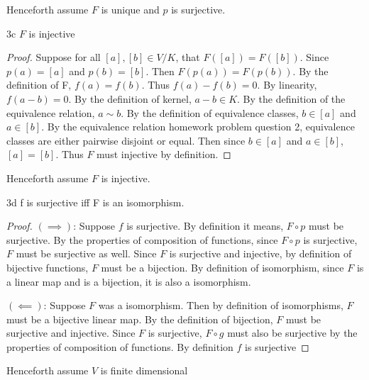\documentclass{article}
\begin{document}
Henceforth assume $F$ is unique and $p$ is surjective.

\begin{claim}{3c}
    $F$ is injective
\end{claim}
\begin{proof}
    Suppose for all $[a], [b] \in V/K$, that $F([a]) = F([b])$. Since $p(a) = [a]$ and $p(b) = [b]$. Then $F(p(a)) = F(p(b))$. By the definition of F, $f(a) = f(b)$. Thus $f(a) - f(b) = 0$. By linearity, $f(a - b) = 0$. By the definition of kernel, $a - b \in K$. By the definition of the equivalence relation, $a \sim b$. By the definition of equivalence classes, $b \in [a]$ and $a \in [b]$. By the equivalence relation homework problem question 2, equivalence classes are either pairwise disjoint or equal. Then since $b \in [a]$ and $a \in [b]$, $[a] = [b]$. Thus $F$ must injective by definition. 
\end{proof}

Henceforth assume $F$ is injective.

\begin{claim}{3d}
    f is surjective iff F is an isomorphism.
\end{claim}
\begin{proof}
    $(\implies)$: Suppose $f$ is surjective. By definition it means, $F \circ p$ must be surjective. By the properties of composition of functions, since $F \circ p$ is surjective, $F$ must be surjective as well. Since $F$ is surjective and injective, by definition of bijective functions, $F$ must be a bijection. By definition of isomorphism, since $F$ is a linear map and is a bijection, it is also a isomorphism.

    $(\impliedby)$: Suppose $F$ was a isomorphism. Then by definition of isomorphisms, $F$ must be a bijective linear map. By the definition of bijection, $F$ must be surjective and injective. Since $F$ is surjective, $F \circ g$ must also be surjective by the properties of composition of functions. By definition $f$ is surjective 
\end{proof}

Henceforth assume $V$ is finite dimensional
\end{document}
